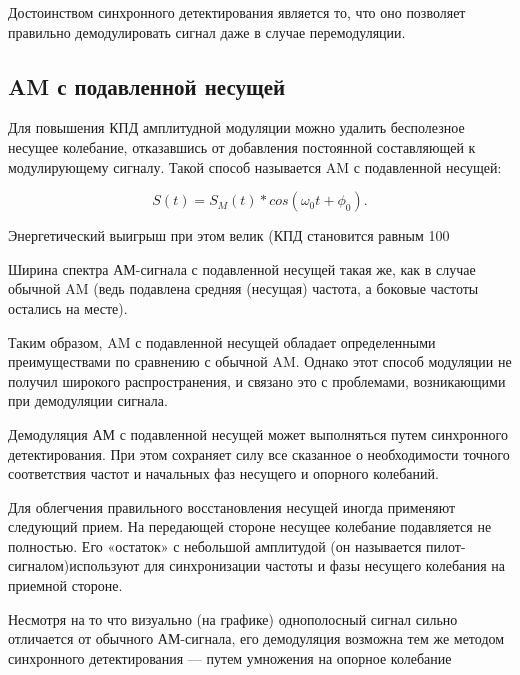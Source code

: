 \documentclass[a4paper,14pt]{article}
\begin{document}
\hspace{0,5cm}Достоинством синхронного детектирования является то, что оно позволяет
правильно демодулировать сигнал даже в случае перемодуляции.

\subsection{AM с подавленной несущей}

\hspace{0,5cm}Для повышения КПД амплитудной модуляции можно удалить бесполезное несущее колебание, отказавшись от добавления постоянной составляющей к модулирующему сигналу. Такой способ называется AM с подавленной несущей:

\begin{equation}
	S(t) = S_M(t)*cos(\omega_0t + \phi_0).
\end{equation}

\hspace{0,5cm}Энергетический выигрыш при этом велик (КПД становится равным 100 %

\hspace{0,5cm}Ширина спектра АМ-сигнала с подавленной несущей такая же, как в случае обычной AM (ведь подавлена средняя (несущая) частота, а боковые частоты
остались на месте).

\hspace{0,5cm}Таким образом, AM с подавленной несущей обладает определенными
преимуществами по сравнению с обычной AM. Однако этот способ модуляции не получил широкого распространения, и связано это с проблемами, возникающими при демодуляции сигнала.

\hspace{0,5cm}Демодуляция АМ с подавленной несущей может выполняться путем синхронного детектирования. При этом сохраняет силу все сказанное о необходимости точного соответствия частот и начальных фаз несущего и опорного
колебаний.

\hspace{0,5cm}Для облегчения правильного восстановления несущей иногда применяют
следующий прием. На передающей стороне несущее колебание подавляется не
полностью. Его «остаток» с небольшой амплитудой (он называется пилот-сигналом)используют для синхронизации частоты и фазы несущего колебания на
приемной стороне.

\hspace{0,5cm}Несмотря на то что визуально (на графике) однополосный сигнал сильно отличается от обычного АМ-сигнала, его демодуляция возможна тем же методом
синхронного детектирования — путем умножения на опорное колебание
\end{document}
